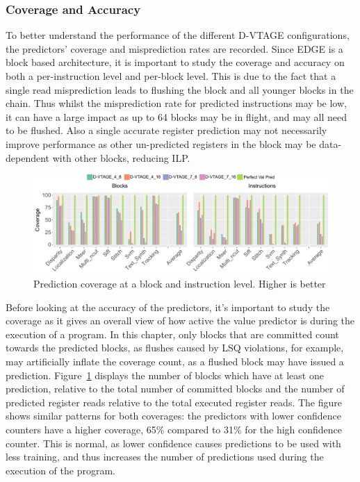 \subsubsection{Coverage and Accuracy}
To better understand the performance of the different D-VTAGE configurations, the predictors' coverage and misprediction rates are recorded.
Since EDGE is a block based architecture, it is important to study the coverage and accuracy on both a per-instruction level and per-block level.
This is due to the fact that a single read misprediction leads to flushing the block and all younger blocks in the chain.
Thus whilst the misprediction rate for predicted instructions may be low, it can have a large impact as up to 64 blocks may be in flight, and may all need to be flushed.
Also a single accurate register prediction may not necessarily improve performance as other un-predicted registers in the block may be data-dependent with other blocks, reducing ILP.

\begin{figure}[t]
    \centering
    \includegraphics[width=1\textwidth]{chapter3/graphics/coverageFull.pdf}
    \caption{Prediction coverage at a block and instruction level. Higher is better}
    \label{fig:vtag_cov_block}
	\vspace{1em}
\end{figure}

Before looking at the accuracy of the predictors, it's important to study the coverage as it gives an overall view of how active the value predictor is during the execution of a program.
In this chapter, only blocks that are committed count towards the predicted blocks, as flushes caused by LSQ violations, for example, may artificially inflate the coverage count, as a flushed block may have issued a prediction.
Figure~\ref{fig:vtag_cov_block} displays the number of blocks which have at least one prediction, relative to the total number of committed blocks and the number of predicted register reads relative to the total executed register reads.
The figure shows similar patterns for both coverages: the predictors with lower confidence counters have a higher coverage, 65\% compared to 31\% for the high confidence counter.
This is normal, as lower confidence causes predictions to be used with less training, and thus increases the number of predictions used during the execution of the program.

